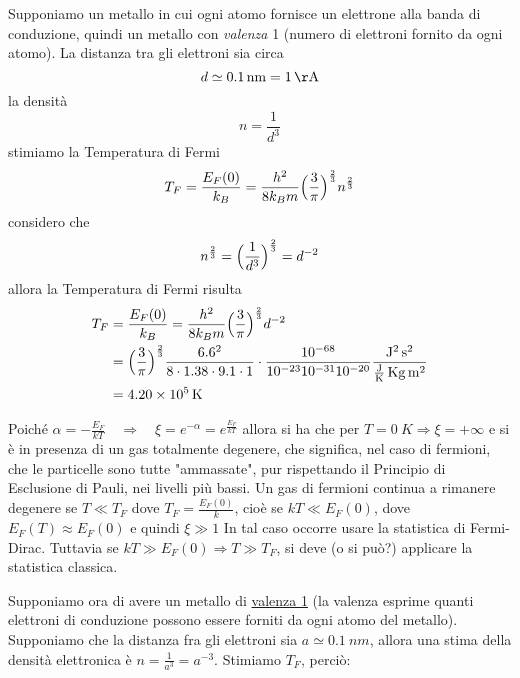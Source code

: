 Supponiamo un metallo in cui ogni atomo fornisce un elettrone alla banda di conduzione, quindi un metallo con \textit{valenza} 1 (numero di elettroni fornito da ogni atomo).
La distanza tra gli elettroni sia circa
\begin{equation}
d \simeq \SI{0.1}{n m} = \SI{1}{\AA}
\end{equation}
la densità
\begin{equation}
n = \frac{1}{d^3}
\end{equation}
stimiamo la Temperatura di Fermi
\begin{equation}
T_F = \frac{E_F(0)}{k_B} = \frac{h^2}{8k_B m} \Bigl(  \frac{3}{\pi}  \Bigr)^{ \frac{2}{3} } n^{ \frac{2}{3} }
\end{equation}
considero che 
\begin{equation}
n^{ \frac{2}{3} } = \Bigl(  \frac{1}{d^3}  \Bigr)^{ \frac{2}{3} } = d^{ -2 }
\end{equation}
allora la Temperatura di Fermi risulta
\begin{equation}
\begin{split}
T_F & = \frac{E_F(0)}{k_B} = \frac{h^2}{8k_B m} \Bigl(  \frac{3}{\pi}  \Bigr)^{ \frac{2}{3} } d^{ -2 } \\
& = \Bigl(\frac{3}{\pi}\Bigr)^{\frac{2}{3}}\frac{6.6^2}{8 \cdot 1.38 \cdot 9.1 \cdot 1} 
\cdot \frac{10^{-68}}{10^{-23}10^{-31}10^{-20}} \frac{\SI{}{J^2.s^2}}{\SI{}{\frac{J}{K}.Kg.m^2}} \\
& = \SI{4.20e5}{K}
\end{split}
\end{equation}





\newpage
\iffalse

Poiché $\alpha = -\frac{ E_F}{k T} \quad \Rightarrow \quad \xi = e^{-\alpha} = e^{ \frac{ E_F}{k T}}$ allora si ha che per $T=\SI{0}{K} \Rightarrow \xi = +\infty $
e si è in presenza di un gas totalmente degenere, che significa, nel caso di fermioni, che le particelle sono tutte "ammassate", pur rispettando il Principio di Esclusione di Pauli, nei livelli più bassi.
Un gas di fermioni continua a rimanere degenere se $T \ll T_F$ dove $T_F = \frac{ E_F(0)}{k}$, cioè se $kT \ll E_F(0)$, 
dove $E_F(T) \approx E_F(0)$ e quindi $\xi \gg 1$
In tal caso occorre usare la statistica di Fermi-Dirac.
Tuttavia se $kT \gg E_F(0) \Rightarrow T \gg T_F $, si deve (o si può?) applicare la statistica classica.

Supponiamo ora di avere un metallo di \underline{valenza 1} (la valenza esprime quanti elettroni di conduzione possono essere forniti da ogni atomo del metallo).
Supponiamo che la distanza fra gli elettroni sia $a \simeq \SI{0.1}{nm}$, allora una stima della densità elettronica è $n = \frac{ 1}{a^{ 3}} = a^{ -3}$.
Stimiamo $T_F$, perciò:

